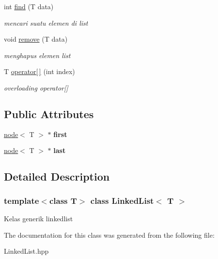 \begin{DoxyCompactItemize}
\mbox{\label{classLinkedList_a35d443ed5be16bab9051c648e6e36d5e}} 
int \hyperlink{classLinkedList_a35d443ed5be16bab9051c648e6e36d5e}{find} (T data)
\begin{DoxyCompactList}\small\item\em mencari suatu elemen di list \end{DoxyCompactList}\item 
\mbox{\label{classLinkedList_ab9aa6e03f271785f6b488d8c4cc3f3c7}} 
void \hyperlink{classLinkedList_ab9aa6e03f271785f6b488d8c4cc3f3c7}{remove} (T data)
\begin{DoxyCompactList}\small\item\em menghapus elemen list \end{DoxyCompactList}\item 
\mbox{\label{classLinkedList_a066a9a70c15be13a120b38305560135c}} 
T \hyperlink{classLinkedList_a066a9a70c15be13a120b38305560135c}{operator\mbox{[}$\,$\mbox{]}} (int index)
\begin{DoxyCompactList}\small\item\em overloading operator\mbox{[}\mbox{]} \end{DoxyCompactList}\end{DoxyCompactItemize}
\subsection*{Public Attributes}
\begin{DoxyCompactItemize}
\item 
\mbox{\label{classLinkedList_acaeb0499689a66aa0f0c6f71864da9a2}} 
\hyperlink{structnode}{node}$<$ T $>$ $\ast$ {\bfseries first}
\item 
\mbox{\label{classLinkedList_ab584a6000168e8e43549dffda60240b2}} 
\hyperlink{structnode}{node}$<$ T $>$ $\ast$ {\bfseries last}
\end{DoxyCompactItemize}


\subsection{Detailed Description}
\subsubsection*{template$<$class T$>$\newline
class Linked\+List$<$ T $>$}

Kelas generik linkedlist 

The documentation for this class was generated from the following file\+:\begin{DoxyCompactItemize}
\item 
Linked\+List.\+hpp\end{DoxyCompactItemize}

